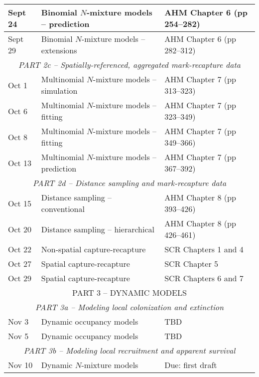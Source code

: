 \documentclass[12pt]{article}
\begin{document}
\begin{center}
\begin{tabular}[c]{lll}
Sept 24    & Binomial $N$-mixture models -- prediction    & AHM Chapter 6 (pp 254--282)      \\
\hline
Sept 29    & Binomial $N$-mixture models -- extensions    & AHM Chapter 6 (pp 282--312)      \\
\hline
           \multicolumn{3}{c}{\it PART 2c -- Spatially-referenced, aggregated mark-recapture data} \\
\hline
Oct 1      & Multinomial $N$-mixture models -- simulation & AHM Chapter 7 (pp 313--323)      \\
\hline
Oct 6      & Multinomial $N$-mixture models -- fitting    & AHM Chapter 7 (pp 323--349)      \\
Oct 8      & Multinomial $N$-mixture models -- fitting    & AHM Chapter 7 (pp 349--366)      \\
\hline
Oct 13     & Multinomial $N$-mixture models -- prediction & AHM Chapter 7 (pp 367--392)      \\
\hline
           \multicolumn{3}{c}{\it PART 2d -- Distance sampling and mark-recapture data} \\
\hline
Oct 15     & Distance sampling -- conventional            & AHM Chapter 8 (pp 393--426)      \\
\hline
Oct 20     & Distance sampling -- hierarchical            & AHM Chapter 8 (pp 426--461)      \\
Oct 22     & Non-spatial capture-recapture                & SCR Chapters 1 and 4             \\
\hline
Oct 27     & Spatial capture-recapture                    & SCR Chapter 5                    \\
Oct 29     & Spatial capture-recapture                    & SCR Chapters 6 and 7             \\
\hline
           \multicolumn{3}{c}{PART 3 -- DYNAMIC MODELS}                                    \\
           \multicolumn{3}{c}{\it PART 3a -- Modeling local colonization and extinction} \\
\hline
Nov 3      & Dynamic occupancy models                     & TBD                              \\
Nov 5      & Dynamic occupancy models                     & TBD                              \\
\hline
           \multicolumn{3}{c}{\it PART 3b -- Modeling local recruitment and apparent survival} \\
\hline
Nov 10     & Dynamic $N$-mixture models                   & Due: first draft                 \\

\end{tabular}
\end{center}
\end{document}
